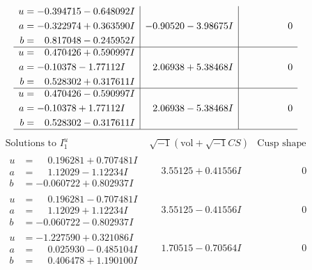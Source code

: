 \documentclass[1p]{elsarticle_modified}
\theoremstyle{definition}
\newcommand{\I}{\sqrt{-1}}
\begin{document}
$$\begin{array}{c|c|c}
\begin{aligned}
u &= -0.394715 - 0.648092 I \\
a &= -0.322974 + 0.363590 I \\
b &= \phantom{-}0.817048 - 0.245952 I\end{aligned}
 & -0.90520 - 3.98675 I & \phantom{-0.000000 } 0 \\ \hline\begin{aligned}
u &= \phantom{-}0.470426 + 0.590997 I \\
a &= -0.10378 - 1.77112 I \\
b &= \phantom{-}0.528302 + 0.317611 I\end{aligned}
 & \phantom{-}2.06938 + 5.38468 I & \phantom{-0.000000 } 0 \\ \hline\begin{aligned}
u &= \phantom{-}0.470426 - 0.590997 I \\
a &= -0.10378 + 1.77112 I \\
b &= \phantom{-}0.528302 - 0.317611 I\end{aligned}
 & \phantom{-}2.06938 - 5.38468 I & \phantom{-0.000000 } 0\\
 \hline 
 \end{array}$$\newpage$$\begin{array}{c|c|c}  
\text{Solutions to }I^u_{1}& \I (\text{vol} + \sqrt{-1}CS) & \text{Cusp shape}\\
 \hline 
\begin{aligned}
u &= \phantom{-}0.196281 + 0.707481 I \\
a &= \phantom{-}1.12029 - 1.12234 I \\
b &= -0.060722 + 0.802937 I\end{aligned}
 & \phantom{-}3.55125 + 0.41556 I & \phantom{-0.000000 } 0 \\ \hline\begin{aligned}
u &= \phantom{-}0.196281 - 0.707481 I \\
a &= \phantom{-}1.12029 + 1.12234 I \\
b &= -0.060722 - 0.802937 I\end{aligned}
 & \phantom{-}3.55125 - 0.41556 I & \phantom{-0.000000 } 0 \\ \hline\begin{aligned}
u &= -1.227590 + 0.321086 I \\
a &= \phantom{-}0.025930 - 0.485104 I \\
b &= \phantom{-}0.406478 + 1.190100 I\end{aligned}
 & \phantom{-}1.70515 - 0.70564 I & \phantom{-0.000000 } 0 \\ \hline\begin{aligned}

\end{aligned}
\end{array}$$
\end{document}
